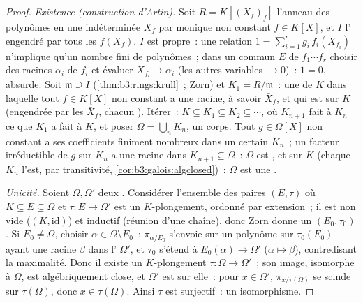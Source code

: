 \begin{proof}
\emph{Existence (construction d'Artin).} Soit $R = K[(X_f)_f]$
l'anneau des polynômes en une indéterminée $X_f$ par monique non
constant $f \in K[X]$, et $I$ l' engendré par tous les
$f(X_f)$. $I$ est propre~: une relation $1 = \sum_{i=1}^r g_i\,
f_i(X_{f_i})$ n'implique qu'un nombre fini de polynômes~; dans
un  commun $E$ de $f_1\cdots f_r$
choisir des racines $\alpha_i$ de $f_i$ et évaluer $X_{f_i}
\mapsto \alpha_i$ (les autres variables $\mapsto 0$)~: $1 =
0$, absurde. Soit $\mathfrak m \supseteq I$ 
(\cref{thm:b3:rings:krull}~; Zorn) et $K_1 = R/\mathfrak m$~:
une  de $K$ dans laquelle tout $f \in K[X]$
non constant a une racine, à savoir $\bar X_f$, et qui est
 sur $K$ (engendrée par les $\bar X_f$, chacun
). Itérer~: $K \subseteq K_1 \subseteq K_2 \subseteq
\cdots$, où $K_{n+1}$ fait à $K_n$ ce que $K_1$ a fait à $K$,
et poser $\Omega = \bigcup_n K_n$, un corps. Tout $g \in
\Omega[X]$ non constant a ses coefficients finiment nombreux
dans un certain $K_n$~; un facteur irréductible de $g$ sur
$K_n$ a une racine dans $K_{n+1} \subseteq \Omega$~: $\Omega$
est , et  sur $K$ (chaque $K_n$
l'est, par transitivité, \cref{cor:b3:galois:algclosed})~:
$\Omega$ est une .

\emph{Unicité.} Soient $\Omega, \Omega'$ deux . Considérer l'ensemble des paires $(E, \tau)$ où
$K \subseteq E \subseteq \Omega$ et $\tau\colon E \to
\Omega'$ est un $K$-plongement, ordonné par extension~; il est
non vide ($(K, \mathrm{id})$) et inductif (réunion d'une
chaîne), donc Zorn donne un  $(E_0, \tau_0)$. Si $E_0
\neq \Omega$, choisir $\alpha \in \Omega\setminus E_0$~:
$\pi_{\alpha/E_0}$ s'envoie sur un polynôme sur $\tau_0(E_0)$
ayant une racine $\beta$ dans l'
$\Omega'$, et $\tau_0$ s'étend à $E_0(\alpha) \to \Omega'$
($\alpha \mapsto \beta$), contredisant la maximalité. Donc il
existe un $K$-plongement $\tau \colon \Omega \to \Omega'$~;
son image, isomorphe à $\Omega$, est algébriquement close, et
$\Omega'$ est  sur elle~: pour $x \in \Omega'$,
$\pi_{x/\tau(\Omega)}$ se scinde sur $\tau(\Omega)$, donc $x
\in \tau(\Omega)$. Ainsi $\tau$ est surjectif~: un
isomorphisme.
\end{proof}

